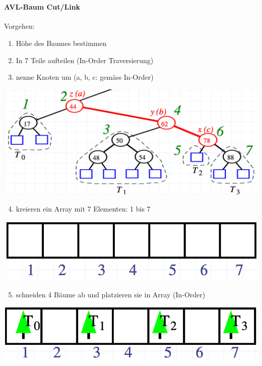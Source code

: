 \vfill
$ $
\columnbreak

\paragraph{AVL-Baum Cut/Link}
Vorgehen:
\begin{enumerate}
    \item Höhe des Baumes bestimmen
    \item In 7 Teile aufteilen (In-Order Traversierung)
    \item nenne Knoten um (a, b, c: gemäss In-Order)
\end{enumerate}
\vspace{-8pt}
\begin{center}
    \includegraphics[scale=.28]{graphic/02 AVLTrees/Cut-Link1.png}
\end{center}
\vspace{-8pt}

\begin{enumerate}
    \setcounter{enumi}{3}
    \item kreieren ein Array mit 7 Elementen: 1 bis 7
\end{enumerate}
\vspace{-8pt}
\begin{center}
    \includegraphics[scale=.2]{graphic/02 AVLTrees/Cut-Link2.png}
\end{center}
\vspace{-8pt}

\begin{enumerate}
    \setcounter{enumi}{4}
    \item schneiden 4 Bäume ab und platzieren sie in Array (In-Order)
\end{enumerate}
\vspace{-8pt}
\begin{center}
    \includegraphics[scale=.2]{graphic/02 AVLTrees/Cut-Link3.png}
\end{center}
\vspace{-8pt}

